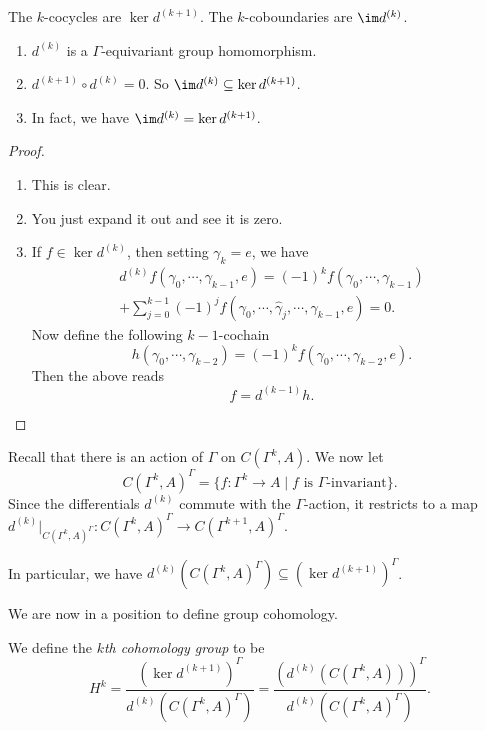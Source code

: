 \documentclass[a4paper]{article}
\begin{document}
\begin{defi}
  The $k$-cocycles are $\ker d^{(k + 1)}$.
  The $k$-coboundaries are $\im d^{(k)}$.
\end{defi}

\begin{lemma}\leavevmode
  \begin{enumerate}
    \item $d^{(k)}$ is a $\Gamma$-equivariant group homomorphism.
    \item $d^{(k + 1)} \circ d^{(k)} = 0 $. So $\im d^{(k)} \subseteq \ker d^{(k + 1)}$.
    \item In fact, we have $\im d^{(k)} = \ker d^{(k + 1)}$.
  \end{enumerate}
\end{lemma}

\begin{proof}\leavevmode
  \begin{enumerate}
    \item This is clear.
    \item You just expand it out and see it is zero.
    \item If $f \in \ker d^{(k)}$, then setting $\gamma_k = e$, we have
      \begin{multline*}
        d^{(k)} f(\gamma_0, \cdots, \gamma_{k - 1}, e) = (-1)^k f(\gamma_0, \cdots, \gamma_{k - 1}) \\
        + \sum_{j = 0}^{k - 1} (-1)^j f(\gamma_0, \cdots, \hat{\gamma}_j, \cdots, \gamma_{k - 1}, e) = 0.
      \end{multline*}
      Now define the following $k - 1$-cochain
      \[
        h(\gamma_0, \cdots, \gamma_{k - 2}) = (-1)^k f(\gamma_0, \cdots, \gamma_{k - 2}, e).
      \]
      Then the above reads
      \[
        f = d^{(k - 1)} h.
      \]
  \end{enumerate}
\end{proof}
Recall that there is an action of $\Gamma$ on $C(\Gamma^k, A)$. We now let
\[
  C(\Gamma^k, A)^\Gamma = \{f: \Gamma^k \to A \mid f \text{ is $\Gamma$-invariant}\}.
\]
Since the differentials $d^{(k)}$ commute with the $\Gamma$-action, it restricts to a map $d^{(k)}|_{C(\Gamma^k, A)^\Gamma} : C(\Gamma^k, A)^\Gamma \to C(\Gamma^{k + 1}, A)^\Gamma$.

In particular, we have $d^{(k)} (C(\Gamma^k, A)^\Gamma) \subseteq (\ker d^{(k + 1)})^\Gamma$.

We are now in a position to define group cohomology.
\begin{defi}
  We define the \emph{$k$th cohomology group} to be
  \[
    H^k = \frac{(\ker d^{(k + 1)})^\Gamma}{d^{(k)} (C(\Gamma^k, A)^\Gamma)} = \frac{(d^{(k)} (C(\Gamma^k, A)))^\Gamma}{d^{(k)} (C(\Gamma^k, A)^\Gamma)}.
  \]
\end{defi}
\end{document}
